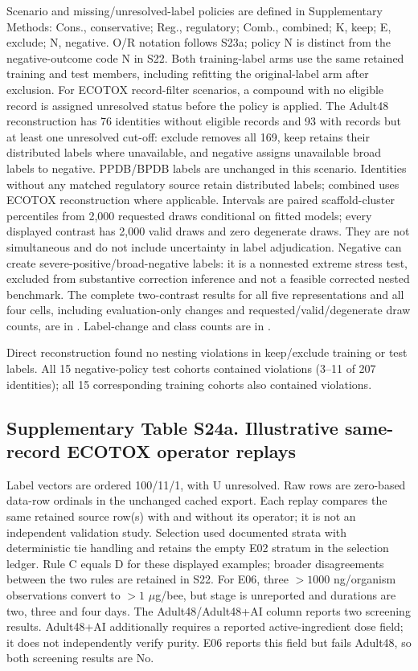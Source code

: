Scenario and missing/unresolved-label policies are defined in Supplementary Methods: Cons., conservative; Reg., regulatory; Comb., combined; K, keep; E, exclude; N, negative. O/R notation follows S23a; policy N is distinct from the negative-outcome code N in S22. Both training-label arms use the same retained training and test members, including refitting the original-label arm after exclusion. For ECOTOX record-filter scenarios, a compound with no eligible record is assigned unresolved status before the policy is applied. The Adult48 reconstruction has 76 identities without eligible records and 93 with records but at least one unresolved cut-off: exclude removes all 169, keep retains their distributed labels where unavailable, and negative assigns unavailable broad labels to negative. PPDB/BPDB labels are unchanged in this scenario. Identities without any matched regulatory source retain distributed labels; combined uses ECOTOX reconstruction where applicable. Intervals are paired scaffold-cluster percentiles from 2,000 requested draws conditional on fitted models; every displayed contrast has 2,000 valid draws and zero degenerate draws. They are not simultaneous and do not include uncertainty in label adjudication. Negative can create severe-positive/broad-negative labels: it is a nonnested extreme stress test, excluded from substantive correction inference and not a feasible corrected nested benchmark. The complete two-contrast results for all five representations and all four cells, including evaluation-only changes and requested/valid/degenerate draw counts, are in . Label-change and class counts are in .

Direct reconstruction found no nesting violations in keep/exclude training or test labels. All 15 negative-policy test cohorts contained violations (3--11 of 207 identities); all 15 corresponding training cohorts also contained violations.

\subsection*{Supplementary Table S24a. Illustrative same-record ECOTOX operator replays}

Label vectors are ordered 100/11/1, with U unresolved. Raw rows are zero-based data-row ordinals in the unchanged cached export. Each replay compares the same retained source row(s) with and without its operator; it is not an independent validation study. Selection used documented strata with deterministic tie handling and retains the empty E02 stratum in the selection ledger. Rule C equals D for these displayed examples; broader disagreements between the two rules are retained in S22. For E06, three $>1000$ ng/organism observations convert to $>1$ $\mu$g/bee, but stage is unreported and durations are two, three and four days. The Adult48/Adult48+AI column reports two screening results. Adult48+AI additionally requires a reported active-ingredient dose field; it does not independently verify purity. E06 reports this field but fails Adult48, so both screening results are No.

